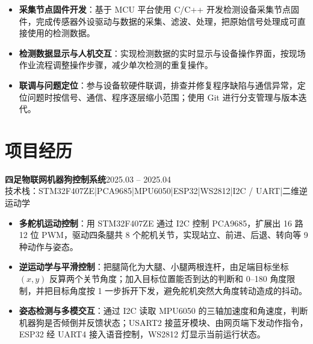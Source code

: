 \documentclass[10pt,a4paper]{article}
\newcommand{\projectblock}[3]{%
    {\bfseries\color{darktext}#1}\hfill{\color{graytext}#2}\\%
    {\small\color{graytext}#3}%
    \vspace{0.15em}%
}
\begin{document}
\vspace{2pt}

\begin{itemize}[leftmargin=1.5em, itemsep=1pt, parsep=0pt, topsep=2pt]
    \item \textbf{采集节点固件开发}：基于 MCU 平台使用 C/C++ 开发检测设备采集节点固件，完成传感器外设驱动与数据的采集、滤波、处理，把原始信号处理成可直接使用的检测数据。
    \item \textbf{检测数据显示与人机交互}：实现检测数据的实时显示与设备操作界面，按现场作业流程调整操作步骤，减少单次检测的重复操作。
    \item \textbf{联调与问题定位}：参与设备软硬件联调，排查并修复程序缺陷与通信异常，定位问题时按信号、通信、程序逐层缩小范围；使用 Git 进行分支管理与版本迭代。
\end{itemize}

\vspace{0.2em}

\section{\faProjectDiagram\hspace{0.4em}项目经历}

\projectblock{四足物联网机器狗控制系统}{2025.03 -- 2025.04}{技术栈：STM32F407ZE\hspace{0.3em}|\hspace{0.3em}PCA9685\hspace{0.3em}|\hspace{0.3em}MPU6050\hspace{0.3em}|\hspace{0.3em}ESP32\hspace{0.3em}|\hspace{0.3em}WS2812\hspace{0.3em}|\hspace{0.3em}I2C / UART\hspace{0.3em}|\hspace{0.3em}二维逆运动学}

\begin{itemize}[leftmargin=1.5em, itemsep=1pt, parsep=0pt, topsep=2pt]
    \item \textbf{多舵机运动控制}：用 STM32F407ZE 通过 I2C 控制 PCA9685，扩展出 16 路 12 位 PWM，驱动四条腿共 8 个舵机关节，实现站立、前进、后退、转向等 9 种动作与姿态。
    \item \textbf{逆运动学与平滑控制}：把腿简化为大腿、小腿两根连杆，由足端目标坐标 $(x, y)$ 反算两个关节角度；加入目标位置能否到达的判断和 0\textdegree--180\textdegree{} 角度限制，并把目标角度按 1\textdegree{} 一步拆开下发，避免舵机突然大角度转动造成的抖动。
    \item \textbf{姿态检测与多模交互}：通过 I2C 读取 MPU6050 的三轴加速度和角速度，判断机器狗是否倾倒并反馈状态；USART2 接蓝牙模块、由网页端下发动作指令，ESP32 经 UART4 接入语音控制，WS2812 灯显示当前运行状态。
\end{itemize}
\end{document}
